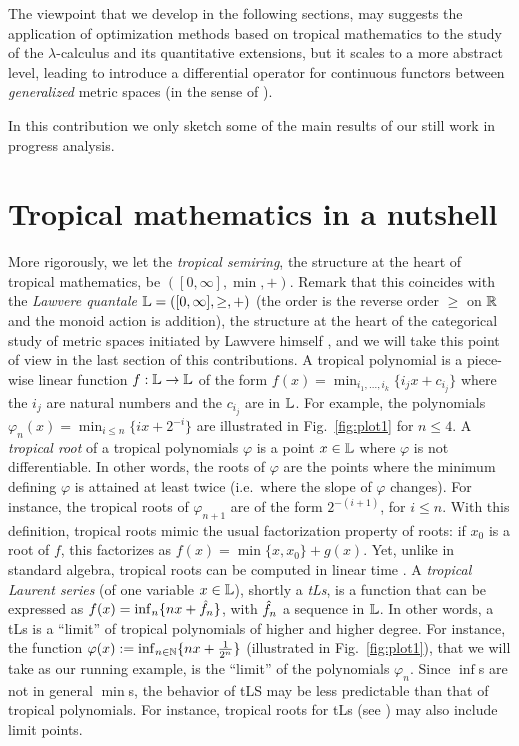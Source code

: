 \documentclass[submission,%
]{eptcs}
\begin{document}
The viewpoint that we develop in the following sections, may suggests the application of optimization methods based on tropical mathematics to the study of the $\lambda$-calculus and its quantitative extensions, but it scales to a 
more abstract level, leading to introduce a 
differential operator for continuous functors between \emph{generalized} metric spaces (in the sense of \cite{Lawvere1973}).

In this contribution we only sketch some of the main results of our still work in progress analysis.

\section{Tropical mathematics in a nutshell}

More rigorously, we let the \emph{tropical semiring}, the structure at the heart of tropical mathematics, be $([0,\infty], \min, +)$.
Remark that this coincides with the \emph{Lawvere quantale} $\mathbb{L}=([0,\infty], \geq, +)$ \cite{Hofmann2014, Stubbe2014} (the order is the reverse order $\geq$ on $\mathbb{R}$ and the monoid action is addition), the structure at the heart of the categorical study of metric spaces initiated by Lawvere himself \cite{Lawvere1973}, and we will take this point of view in the last section of this contributions.
A tropical polynomial is a piece-wise linear function $f:\mathbb{L}\to \mathbb{L}$ of the form $f(x)=\min_{i_{1},\dots, i_{k}}\{i_{j}x+c_{i_{j}}\}$
where the $i_{j}$ are natural numbers and the $c_{i_{j}}$ are in $\mathbb{L}$.
For example, the polynomials $\varphi_{n}(x)=\min_{i\leq n}\{ix+2^{-i}\}$
are illustrated in Fig.~\ref{fig:plot1} for $n\leq 4$.
A \emph{tropical root} of a tropical polynomials $\varphi$ is a point $x\in \mathbb{L}$ where $\varphi$ is not differentiable. In other words, the roots of $\varphi$ are the points where the minimum defining $\varphi$ is attained at least twice (i.e.~where the slope of $\varphi$ changes). For instance, the tropical roots of $\varphi_{n+1}$ are of the form $2^{-(i+1)}$, for $i \leq n$.
With this definition, tropical roots mimic the usual factorization property of roots: if $x_{0}$ is a root of $f$, this factorizes as
$f(x)=\min\{x,x_{0}\}+ g(x)$. Yet, unlike in standard algebra, tropical roots can be computed in linear time \cite{Noferini2015}.
A \emph{tropical Laurent series} (of one variable $x\in\mathbb{L}$), shortly a \emph{tLs}, is a function that can be expressed as $f(x)=\inf_{n}\{nx+\hat{f}_{n}\}$, with $\hat{f}_{n}$ a sequence in $\mathbb{L}$. In other words, a tLs is a ``limit'' of tropical polynomials of higher and higher degree. For instance, the function $\varphi(x):=\inf_{n\in\mathbb{N}}\{nx+\frac{1}{2^n}\}$ (illustrated in Fig.~\ref{fig:plot1}), that we will take as our running example, 
is the ``limit'' of the polynomials $\varphi_{n}$. Since $\inf$s are not in general $\min$s, the behavior of tLS may be less predictable than that of tropical polynomials. For instance, tropical roots for tLs (see \cite{Porzio2021}) may also include limit points.
\end{document}
